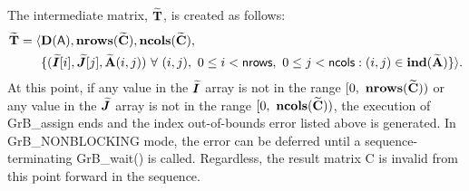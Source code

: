 The intermediate matrix, ${\bf \widetilde{T}}$, is created as follows:
\[
\begin{aligned}
{\bf \widetilde{T}} = \langle & \bold{D}({\sf A}),
                           \bold{nrows}({\bf \widetilde{C}}), 
                           \bold{ncols}({\bf \widetilde{C}}), \\
 & \{ (\bm{\widetilde{I}}[i],\bm{\widetilde{J}}[j],{\bf \widetilde{A}}(i,j)) 
\ \forall \ (i,j), \ 0 \leq i < {\sf nrows}, \ 0 \leq j < {\sf ncols} :
(i,j) \in \bold{ind}({\bf \widetilde{A}}) \} \rangle. 
\end{aligned}
\]
At this point, if any value in the $\bm{\widetilde{I}}$ array is not in
the range $[0,\ \bold{nrows}(\matrix{\widetilde{C}}) )$ or any value in the 
$\bm{\widetilde{J}}$ array is not in the range 
$[0,\ \bold{ncols}(\matrix{\widetilde{C}}))$, the execution of {\sf GrB\_assign} 
ends and the index out-of-bounds error listed above is generated.  In 
{\sf GrB\_NONBLOCKING} mode, the error can be deferred until a 
sequence-terminating {\sf GrB\_wait()} is called.  Regardless, the result 
matrix {\sf C} is invalid from this point forward in the sequence.

